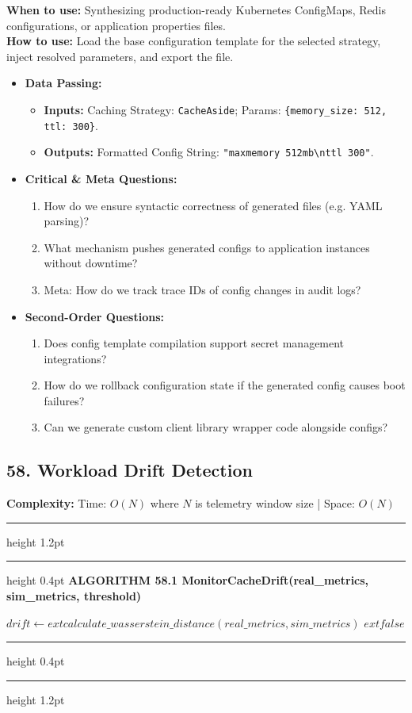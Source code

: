 \documentclass[11pt,a4paper]{article}
\newenvironment{textbookalgo}[2]{%
  \par\addvspace{1.2em}\noindent
  \hrule height 1.2pt
  \vspace{1.5pt}
  \hrule height 0.4pt
  \vspace{5pt}
  {\noindent\large\bfseries\sffamily ALGORITHM #1 \quad #2}
  \par\vspace{5pt}
  \RestyleAlgo{plain}
}{%
  \par\vspace{4pt}
  \hrule height 0.4pt
  \vspace{1.5pt}
  \hrule height 1.2pt
  \par\addvspace{1.2em}
}
\theoremstyle{definition}
\begin{document}
\noindent
\textbf{When to use:} Synthesizing production-ready Kubernetes ConfigMaps, Redis configurations, or application properties files.\\
\textbf{How to use:} Load the base configuration template for the selected strategy, inject resolved parameters, and export the file.
\begin{itemize}[leftmargin=*]
  \item[] \textbf{Data Passing:}
    \begin{itemize}
      \item \textbf{Inputs:} Caching Strategy: \texttt{CacheAside}; Params: \texttt{\{memory\_size: 512, ttl: 300\}}.
      \item \textbf{Outputs:} Formatted Config String: \texttt{"maxmemory 512mb{\textbackslash}nttl 300"}.
    \end{itemize}
  \item[] \textbf{Critical \& Meta Questions:}
  \begin{enumerate}
    \item How do we ensure syntactic correctness of generated files (e.g. YAML parsing)?
    \item What mechanism pushes generated configs to application instances without downtime?
    \item Meta: How do we track trace IDs of config changes in audit logs?
  \end{enumerate}
  \item[] \textbf{Second-Order Questions:}
  \begin{enumerate}
    \item Does config template compilation support secret management integrations?
    \item How do we rollback configuration state if the generated config causes boot failures?
    \item Can we generate custom client library wrapper code alongside configs?
  \end{enumerate}
\end{itemize}
\medskip

\clearpage
\subsection{58. Workload Drift Detection}


\noindent
\textbf{Complexity:} Time: $O(N)$ where $N$ is telemetry window size | Space: $O(N)$
\smallskip

\begin{textbookalgo}{58.1}{MonitorCacheDrift(real\_metrics, sim\_metrics, threshold)}
\begin{algorithm}[H]
$drift \leftarrow 	ext{calculate\_wasserstein\_distance}(real\_metrics, sim\_metrics)$\;
\Return $	ext{false}$\;
\end{algorithm}
\end{textbookalgo}
\end{document}
